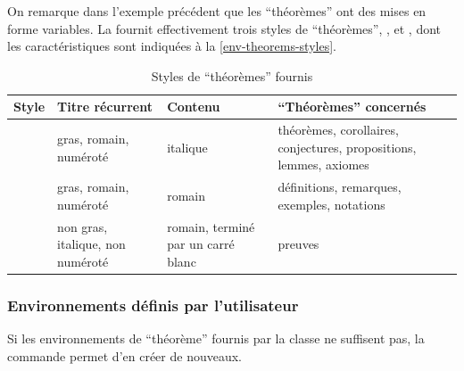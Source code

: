 \documentclass[english,nolocaltoc]{nwejmart}
\newtheorem[style=definition]{fait}
\newtheorem[title=expérience]{experience}
\newtheorem[title-plural=anneaux]{anneau}
\newtheorem[title=idéal,title-plural=idéaux]{ideal}
\begin{document}
On remarque dans l'exemple précédent que les \enquote{théorèmes} ont des mises
en forme variables. La \nwejmauthorcl{} fournit effectivement trois styles de
\enquote{théorèmes}, ,  et
, dont les caractéristiques sont indiquées à la
\vref{env-theorems-styles}.

\begin{table}
  \centering
  \begin{tabulary}{\linewidth}{lLLL}
Style                 & Titre récurrent                  & Contenu                            & \enquote{Théorèmes} concernés               \\\toprule
{}    & gras, romain, numéroté           & italique
                      & théorèmes, corollaires, conjectures, propositions, lemmes, axiomes                                                  \\\midrule
{} & gras, romain, numéroté           & romain                             & définitions, remarques, exemples, notations \\\midrule
{}      & non gras, italique, non numéroté & romain, terminé par un carré blanc & preuves                                     \\\bottomrule
  \end{tabulary}
  \caption{Styles de \enquote{théorèmes} fournis}
  \label{env-theorems-styles}
\end{table}

\subsubsection{Environnements définis par l'utilisateur}
\label{sec:envir-de-type-1}

Si les environnements de \enquote{théorème} fournis par la classe ne suffisent
pas, la commande  permet d'en créer de nouveaux.
\end{document}
